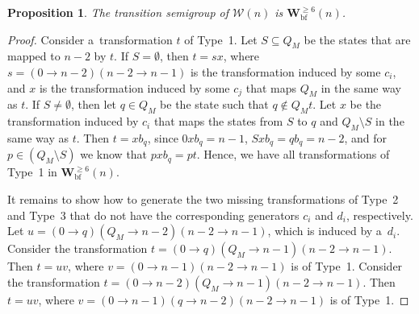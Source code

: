 \documentclass{amsart}
\newtheorem{proposition}[theorem]{Proposition}
\renewcommand{\ge}{\geqslant}
\newcommand{\Wbf}{\mathbf{W}^{\ge 6}_{\mathrm{bf}}}
\newcommand{\cW}{{\mathcal W}}
\begin{document}
\begin{proposition}
The transition semigroup of $\cW(n)$ is $\Wbf(n)$.
\end{proposition}
\begin{proof}
Consider a~transformation $t$ of Type~1.
Let $S \subseteq Q_M$ be the states that are mapped to $n-2$ by $t$.
If $S = \emptyset$, then $t = s x$, where $s = (0 \to n-2)(n-2 \to n-1)$ is the transformation induced by some $c_i$, and $x$ is the transformation induced by some $c_j$ that maps $Q_M$ in the same way as $t$.
If $S \neq \emptyset$, then let $q \in Q_M$ be the state such that $q \notin Q_M t$.
Let $x$ be the transformation induced by $c_i$ that maps the states from $S$ to $q$ and $Q_M \setminus S$ in the same way as $t$.
Then $t = x b_q$, since $0 x b_q = n-1$, $S x b_q = q b_q = n-2$, and for $p \in (Q_M \setminus S)$ we know that $p x b_q = p t$.
Hence, we have all transformations of Type~1 in $\Wbf(n)$.

It remains to show how to generate the two missing transformations of Type~2 and Type~3 that do not have the corresponding generators $c_i$ and $d_i$, respectively.
Let $u = (0 \to q)(Q_M \to n-2)(n-2 \to n-1)$, which is induced by a~$d_i$.
Consider the transformation $t = (0 \to q)(Q_M \to n-1)(n-2 \to n-1)$.
Then $t = u v$, where $v = (0 \to n-1)(n-2 \to n-1)$ is of Type~1.
Consider the transformation $t = (0 \to n-2)(Q_M \to n-1)(n-2 \to n-1)$.
Then $t = u v$, where $v = (0 \to n-1)(q \to n-2)(n-2 \to n-1)$ is of Type~1.
\end{proof}
\end{document}
